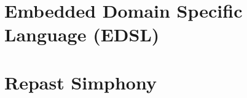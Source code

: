 \documentclass[oneside]{book}
\begin{document}
\section*{Embedded Domain Specific Language (EDSL)}

\section*{Repast Simphony}

\begin{landscape}


\end{landscape}
\end{document}
